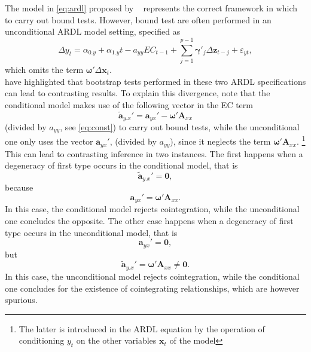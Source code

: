 The model in \eqref{eq:ardl} proposed by ~\citet{pesaran2001} represents the correct framework in which to carry out bound tests. However, bound test are often performed in an unconditional ARDL model setting, specified as
\begin{equation}\label{eq:ardluc}
 	\Delta y_{t}=\alpha_{0.y}+\alpha_{1.y}t -a_{yy}EC_{t-1}+ \sum_{j=1}^{p-1}\boldsymbol{\gamma}'_{j}\Delta\mathbf{z}_{t-j}+\varepsilon_{yt},
\end{equation}
which omits the term $\boldsymbol{\omega}'\Delta\mathbf{x}_{t}$.\\ 
\cite{bertelli2022bootstrap} have highlighted that bootstrap tests performed in these two ARDL specifications can lead to contrasting results. To explain this divergence, note that the conditional model makes use of the following vector in the EC term
\begin{equation}
\widetilde{\mathbf{a}}_{y.x}'=\mathbf{a}_{yx}'-\boldsymbol{\omega}'\mathbf{A}_{xx}
\end{equation}
(divided by $a_{yy}$, see \eqref{eq:const}) to carry out bound tests, while the unconditional one only uses the vector $\mathbf{a}_{yx}'$, (divided by $a_{yy}$), since it neglects the term $\boldsymbol{\omega}'\mathbf{A}_{xx}$. \footnote{The latter is introduced in the ARDL equation by the operation of conditioning $y_t$ on the other variables $\mathbf{x}_t$ of the model} This can lead to contrasting inference in two instances. The first happens when a degeneracy of first type occurs in the conditional model, that is
\begin{equation}\label{eq:deg1cond}
\widetilde{\mathbf{a}}_{y.x}'=\mathbf{0}, 
\end{equation}
because
 \begin{equation} 
 \mathbf{a}_{yx}'=\boldsymbol{\omega}'\mathbf{A}_{xx}.    
 \end{equation}
In this case, the conditional model rejects cointegration, while the unconditional one concludes the opposite.
The other case happens when a degeneracy of first type occurs in the unconditional model, that is 
\begin{equation}\label{eq:deg1uc}
\mathbf{a}_{yx}'=\mathbf{0},
\end{equation}
but 
\begin{equation}
\widetilde{\mathbf{a}}_{y.x}'=\boldsymbol{\omega}'\mathbf{A}_{xx} \neq \mathbf{0}.
 \end{equation}
In this case, the unconditional model rejects cointegration, while the conditional one concludes for the existence of cointegrating relationships, which are however spurious. 
